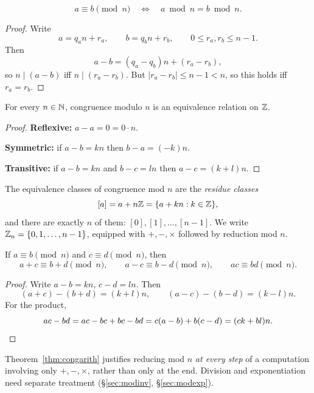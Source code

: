 \documentclass[11pt]{article}
\begin{document}
\begin{theorem}
\label{thm:congremainder}
\[
a\equiv b\pmod n \quad\Longleftrightarrow\quad a\bmod n=b\bmod n.
\]
\end{theorem}

\begin{proof}
Write
\[
a=q_an+r_a, \qquad b=q_bn+r_b, \qquad 0\le r_a,r_b\le n-1.
\]
Then
\[
a-b=(q_a-q_b)n+(r_a-r_b),
\]
so $n\mid(a-b)$ iff $n\mid(r_a-r_b)$. But $|r_a-r_b|\le n-1<n$, so this holds iff $r_a=r_b$.
\end{proof}

\begin{theorem}
\label{thm:congequiv}
For every $n\in\mathbb{N}$, congruence modulo $n$ is an equivalence relation on $\mathbb{Z}$.
\end{theorem}

\begin{proof}
\textbf{Reflexive:} $a-a=0=0\cdot n$.

\smallskip
\noindent\textbf{Symmetric:} if $a-b=kn$ then $b-a=(-k)n$.

\smallskip
\noindent\textbf{Transitive:} if $a-b=kn$ and $b-c=ln$ then $a-c=(k+l)n$.
\end{proof}

\begin{definition}
The equivalence classes of congruence mod $n$ are the \emph{residue classes}
\[
[a]=a+n\mathbb{Z}=\{a+kn : k\in\mathbb{Z}\},
\]
and there are exactly $n$ of them: $[0],[1],\dots,[n-1]$. We write $\mathbb{Z}_n=\{0,1,\dots,n-1\}$, equipped with $+,-,\times$ followed by reduction mod $n$.
\end{definition}

\begin{theorem}
\label{thm:congarith}
If $a\equiv b\pmod n$ and $c\equiv d\pmod n$, then
\[
a+c\equiv b+d\pmod n, \qquad a-c\equiv b-d\pmod n, \qquad ac\equiv bd\pmod n.
\]
\end{theorem}

\begin{proof}
Write $a-b=kn$, $c-d=ln$. Then
\[
(a+c)-(b+d)=(k+l)n, \qquad (a-c)-(b-d)=(k-l)n.
\]
For the product,
\[
ac-bd = ac-bc+bc-bd = c(a-b)+b(c-d) = (ck+bl)n. \qedhere
\]
\end{proof}

\begin{note}
Theorem~\ref{thm:congarith} justifies reducing mod $n$ \emph{at every step} of a computation involving only $+,-,\times$, rather than only at the end. Division and exponentiation need separate treatment (\S\ref{sec:modinv}, \S\ref{sec:modexp}).
\end{note}
\end{document}
